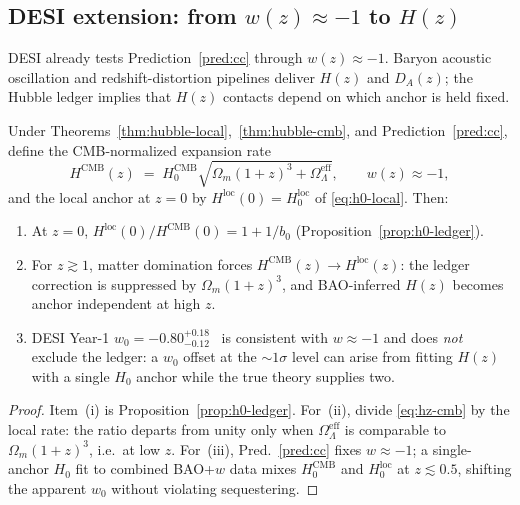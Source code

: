 \subsection{DESI extension: from $w(z)\approx -1$ to $H(z)$}
\label{sec:cosmology:desi-hz}

DESI already tests Prediction~\ref{pred:cc} through $w(z)\approx -1$.
Baryon acoustic oscillation and redshift-distortion pipelines deliver
$H(z)$ and $D_A(z)$; the Hubble ledger implies that $H(z)$ contacts depend on
which anchor is held fixed.

\begin{proposition}
\label{prop:hz-ledger}
Under Theorems~\ref{thm:hubble-local},~\ref{thm:hubble-cmb}, and
Prediction~\ref{pred:cc}, define the CMB-normalized expansion rate
\begin{equation}\label{eq:hz-cmb}
  H^{\mathrm{CMB}}(z)
  \;=\;
  H_0^{\mathrm{CMB}}
  \sqrt{
    \Omega_m(1+z)^3+\Omega_\Lambda^{\mathrm{eff}}
  },
  \qquad
  w(z)\approx -1,
\end{equation}
and the local anchor at $z=0$ by $H^{\mathrm{loc}}(0)=H_0^{\mathrm{loc}}$ of
\eqref{eq:h0-local}. Then:
\begin{enumerate}[label=(\roman*),leftmargin=*]
  \item At $z=0$, $H^{\mathrm{loc}}(0)/H^{\mathrm{CMB}}(0)=1+1/b_0$
    (Proposition~\ref{prop:h0-ledger}).
  \item For $z\gtrsim 1$, matter domination forces
    $H^{\mathrm{CMB}}(z)\to H^{\mathrm{loc}}(z)$: the ledger correction is
    suppressed by $\Omega_m(1+z)^3$, and BAO-inferred $H(z)$ becomes anchor
    independent at high $z$.
  \item DESI Year-1 $w_0=-0.80^{+0.18}_{-0.12}$~\cite{DESI2024} is
    consistent with $w\approx -1$ and does \emph{not} exclude the ledger:
    a $w_0$ offset at the $\sim 1\sigma$ level can arise from fitting
    $H(z)$ with a single $H_0$ anchor while the true theory supplies two.
\end{enumerate}
\end{proposition}

\begin{proof}
Item~(i) is Proposition~\ref{prop:h0-ledger}. For~(ii), divide
\eqref{eq:hz-cmb} by the local rate: the ratio departs from unity only when
$\Omega_\Lambda^{\mathrm{eff}}$ is comparable to $\Omega_m(1+z)^3$, i.e.\ at
low $z$. For~(iii), Pred.~\ref{pred:cc} fixes $w\approx -1$; a single-anchor
$H_0$ fit to combined BAO+$w$ data mixes $H_0^{\mathrm{CMB}}$ and
$H_0^{\mathrm{loc}}$ at $z\lesssim 0.5$, shifting the apparent $w_0$ without
violating sequestering.
\end{proof}

